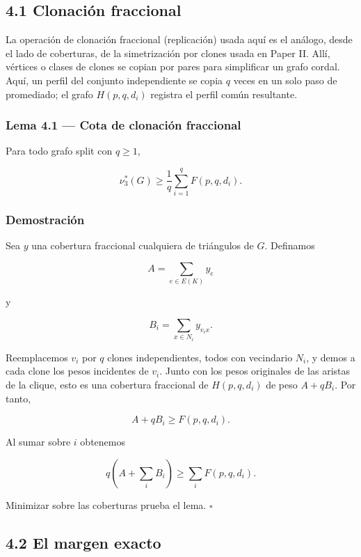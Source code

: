 \documentclass[
  11pt,
]{article}
\begin{document}
\subsection{4.1 Clonación fraccional}\label{clonaciuxf3n-fraccional}

La operación de clonación fraccional (replicación) usada aquí es el análogo, desde el lado de coberturas, de la simetrización por clones usada en Paper II. Allí, vértices o clases de clones se copian por pares para simplificar un grafo cordal. Aquí, un perfil del conjunto independiente se copia \(q\) veces en un solo paso de promediado; el grafo \(H(p,q,d_i)\) registra el perfil común resultante.

\subsubsection{Lema 4.1 --- Cota de clonación fraccional}\label{lema-4.1-cota-de-clonaciuxf3n-fraccional}

Para todo grafo split con \(q\ge1\),

\[
\boxed{
\nu_3^*(G)
\ge
\frac1q\sum_{i=1}^qF(p,q,d_i).
}
\tag{4.1}
\]

\subsubsection{Demostración}\label{demostraciuxf3n-1}

Sea \(y\) una cobertura fraccional cualquiera de triángulos de \(G\). Definamos

\[
A=\sum_{e\in E(K)}y_e
\]

y

\[
B_i=\sum_{x\in N_i}y_{v_ix}.
\]

Reemplacemos \(v_i\) por \(q\) clones independientes, todos con vecindario \(N_i\), y demos a cada clone los pesos incidentes de \(v_i\). Junto con los pesos originales de las aristas de la clique, esto es una cobertura fraccional de \(H(p,q,d_i)\) de peso \(A+qB_i\). Por tanto,

\[
A+qB_i\ge F(p,q,d_i).
\]

Al sumar sobre \(i\) obtenemos

\[
q\left(A+\sum_iB_i\right)
\ge
\sum_iF(p,q,d_i).
\]

Minimizar sobre las coberturas prueba el lema. \(\square\)

\subsection{4.2 El margen exacto}\label{el-margen-exacto}
\end{document}
